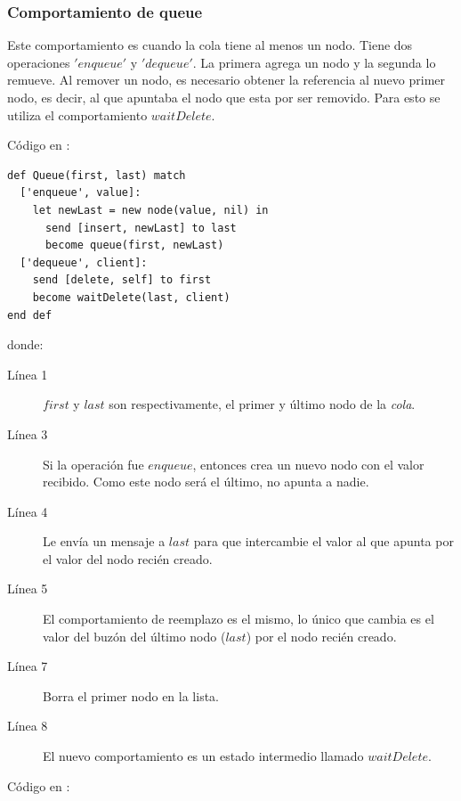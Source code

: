 \subsubsection*{Comportamiento de queue}
Este comportamiento es cuando la cola tiene al menos un nodo. Tiene dos operaciones $'enqueue'$ y $'dequeue'$. La primera agrega un nodo y la segunda lo remueve. Al remover un nodo, es necesario obtener la referencia al nuevo primer nodo, es decir, al que apuntaba el nodo que esta por ser removido. Para esto se utiliza el comportamiento $waitDelete$.

Código en \SAL:

\begin{lstlisting}[language=sal, style=simple]
def Queue(first, last) match 
  ['enqueue', value]: 
    let newLast = new node(value, nil) in
      send [insert, newLast] to last
      become queue(first, newLast)
  ['dequeue', client]: 
    send [delete, self] to first
    become waitDelete(last, client)
end def
\end{lstlisting}
donde:
\begin{description}
 \item [Línea 1] $first$ y $last$ son respectivamente, el primer y último nodo de la \textit{cola}.
 \item [Línea 3] Si la operación fue $enqueue$, entonces crea un nuevo nodo con el valor recibido. Como este nodo será el último, no apunta a nadie.
 \item [Línea 4] Le envía un mensaje a $last$ para que intercambie el valor al que apunta por el valor del nodo recién creado.
 \item [Línea 5] El comportamiento de reemplazo es el mismo, lo único que cambia es el valor del buzón del último nodo ($last$) por el nodo recién creado.
 \item [Línea 7] Borra el primer nodo en la lista.
 \item [Línea 8] El nuevo comportamiento es un estado intermedio llamado $waitDelete$.
\end{description}

Código en \CSP:

